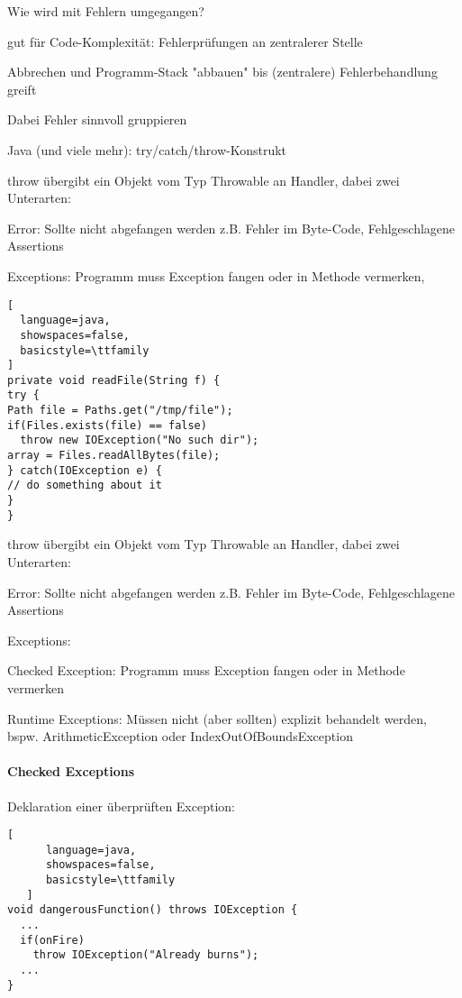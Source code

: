 \documentclass[10pt]{article}
\begin{document}
\begin{itemize*}
  \item Wie wird mit Fehlern umgegangen?
  \item gut für Code-Komplexität: Fehlerprüfungen an zentralerer Stelle
  \begin{itemize*}
    \item Abbrechen und Programm-Stack "abbauen" bis (zentralere) Fehlerbehandlung greift
    \item Dabei Fehler sinnvoll gruppieren
  \end{itemize*}
  \item Java (und viele mehr): try/catch/throw-Konstrukt
  \begin{itemize*}
    \item throw übergibt ein Objekt vom Typ Throwable an Handler, dabei zwei Unterarten:
    \item Error: Sollte nicht abgefangen werden z.B. Fehler im Byte-Code, Fehlgeschlagene Assertions
    \item Exceptions: Programm muss Exception fangen oder in Methode vermerken,
  \end{itemize*}
\end{itemize*}

\begin{lstlisting}[
  language=java,
  showspaces=false,
  basicstyle=\ttfamily
]
private void readFile(String f) {
try {
Path file = Paths.get("/tmp/file");
if(Files.exists(file) == false)
  throw new IOException("No such dir");
array = Files.readAllBytes(file);
} catch(IOException e) {
// do something about it
}
}
\end{lstlisting}


throw übergibt ein Objekt vom Typ Throwable an Handler, dabei zwei Unterarten:
\begin{itemize*}
  \item Error: Sollte nicht abgefangen werden z.B. Fehler im Byte-Code, Fehlgeschlagene Assertions
  \item Exceptions:
  \begin{itemize*}
    \item Checked Exception: Programm muss Exception fangen oder in Methode vermerken
    \item Runtime Exceptions: Müssen nicht (aber sollten) explizit behandelt werden, bspw. ArithmeticException oder IndexOutOfBoundsException
  \end{itemize*}
\end{itemize*}

\paragraph{Checked Exceptions}
Deklaration einer überprüften Exception:
\begin{lstlisting}[
      language=java,
      showspaces=false,
      basicstyle=\ttfamily
   ]
void dangerousFunction() throws IOException {
  ...
  if(onFire)
    throw IOException("Already burns");
  ...
}
\end{lstlisting}
\end{document}
